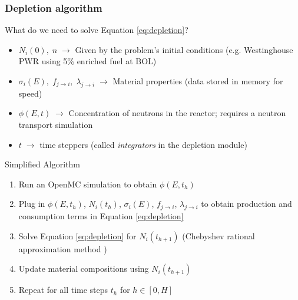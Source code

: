 \begin{frame}
  \frametitle{Depletion algorithm}
    \begin{block}{What do we need to solve Equation \ref{eq:depletion}?}
      \begin{itemize}
          \item $N_{i}(0),\; n\; \rightarrow$ Given by the problem's initial
              conditions (e.g.
              Westinghouse PWR using 5\% enriched fuel at BOL)
          \item $\sigma_{i}(E),\;f_{j\rightarrow i},\; \lambda_{j \rightarrow
              i}\; \rightarrow$ Material properties (data stored in memory
              for speed)
          \item $\phi(E,t)\; \rightarrow$ Concentration of neutrons in the
              reactor; requires a neutron transport simulation
          \item $t\; \rightarrow$ time steppers (called {\it integrators} in the
              depletion module)
      \end{itemize}  
    \end{block}
    \begin{block}{Simplified Algorithm}
      \begin{enumerate}
          \item Run an OpenMC simulation to obtain $\phi(E, t_{h})$ 
          \item Plug in $\phi(E,t_{h})$, $N_{i}(t_{h})$, $\sigma_{i}(E)$, $f_{j\rightarrow
              i}$, $\lambda_{j\rightarrow i}$ to obtain production and consumption
              terms in Equation \ref{eq:depletion}
          \item Solve Equation \ref{eq:depletion} for $N_{i}(t_{h+1})$ (Chebyshev
              rational approximation method \cite{romano_depletion_2021})
          \item Update material compositions using $N_{i}(t_{h+1})$
          \item Repeat for all time steps $t_{h}$ for $h \in [0,H]$
      \end{enumerate}
    \end{block}
\end{frame}

